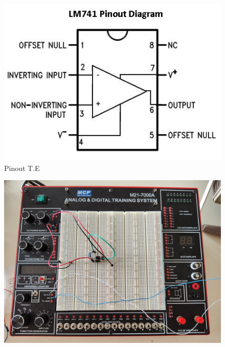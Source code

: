 \documentclass[12pt]{article}
\begin{document}
\begin{figure}[H]
	\centering
	\includegraphics[width=\linewidth]{./res/opamp_pinout.jpg}
	\caption{Pinout Τ.Ε}
\end{figure}

\begin{figure}[H]
	\centering
	\includegraphics[width=\linewidth]{./res/breadboard.jpg}
\end{figure}
\end{document}
